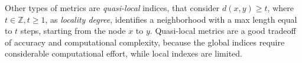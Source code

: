 Other types of metrics are \textit{quasi-local} indices, that consider $d(x,y) \geq t$, where $t\in \mathbb{Z}, t\geq 1 $, as \textit{locality degree}, identifies a neighborhood with a max length equal to $t$ steps, starting from the node $x$ to $y$. Quasi-local metrics are a good tradeoff of accuracy and computational complexity, because the global indices require considerable computational effort, while local indexes are limited. 
%


